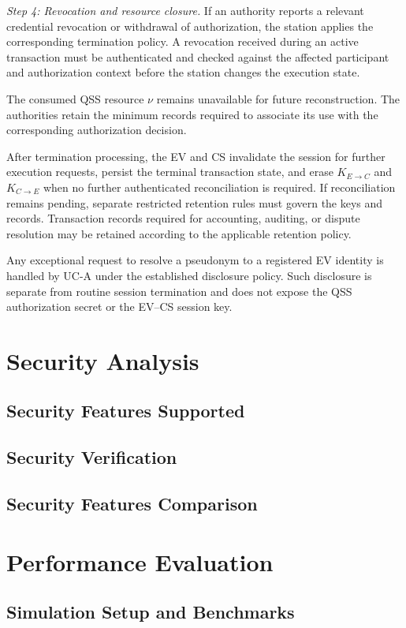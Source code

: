 \documentclass[twocolumn,10pt,journal]{IEEEtran}
\begin{document}
\textit{Step 4: Revocation and resource closure.}
If an authority reports a relevant credential
revocation or withdrawal of authorization,
the station applies the corresponding
termination policy. A revocation received
during an active transaction must be
authenticated and checked against the
affected participant and authorization
context before the station changes the
execution state.

The consumed QSS resource $\nu$ remains
unavailable for future reconstruction.
The authorities retain the minimum records
required to associate its use with the
corresponding authorization decision.

After termination processing, the EV and
CS invalidate the session for further
execution requests, persist the terminal transaction state, and
erase $K_{E\to C}$ and $K_{C\to E}$ when no further authenticated
reconciliation is required. If reconciliation remains pending,
separate restricted retention rules must govern the keys and records. Transaction records required for
accounting, auditing, or dispute resolution
may be retained according to the applicable
retention policy.

Any exceptional request to resolve a
pseudonym to a registered EV identity is
handled by UC-A under the established
disclosure policy. Such disclosure is
separate from routine session termination
and does not expose the QSS authorization
secret or the EV--CS session key.

\section{Security Analysis} \label{sec5}
\subsection{Security Features Supported}
\subsection{Security Verification}
\subsection{Security Features Comparison}

\section{Performance Evaluation} \label{sec6}
\subsection{Simulation Setup and Benchmarks}
\end{document}
